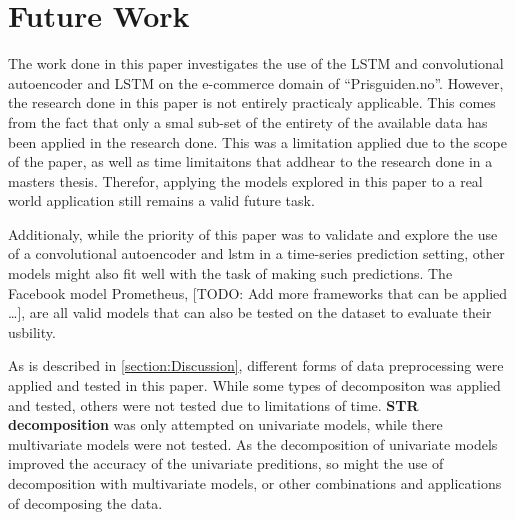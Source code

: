 
\section{Future Work}
\label{sections:Discussion:FutureWork}


The work done in this paper investigates the use of the LSTM and convolutional autoencoder and LSTM
on the e-commerce domain of ``Prisguiden.no''.
However, the research done in this paper is not entirely practicaly applicable.
This comes from the fact that only a smal sub-set of the entirety of the available data has been applied
in the research done.
This was a limitation applied due to the scope of the paper,
as well as time limitaitons that addhear to the research done in a masters thesis.
Therefor, applying the models explored in this paper to a real world application still remains a valid future task.

Additionaly, while the priority of this paper was to validate and explore the use of a convolutional autoencoder and lstm
in a time-series prediction setting, other models might also fit well with the task of making such predictions.
The Facebook model Prometheus, [TODO: Add more frameworks that can be applied \dots ],
are all valid models that can also be tested on the dataset to evaluate their usbility.


As is described in \cref{section:Discussion}, different forms of data preprocessing were applied and tested in this paper.
While some types of decompositon was applied and tested, others were not tested due to limitations of time.
\textbf{STR decomposition} was only attempted on univariate models, while there multivariate models were not tested.
As the decomposition of univariate models improved the accuracy of the univariate preditions,
so might the use of decomposition with multivariate models, or other combinations and applications of decomposing the data.


